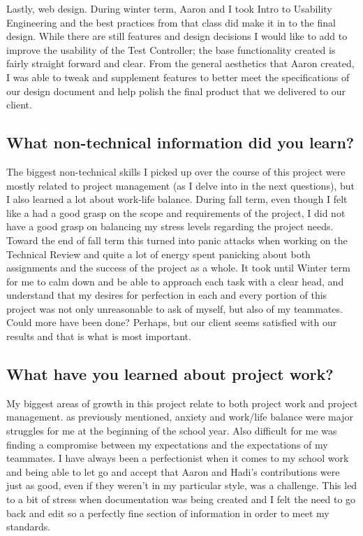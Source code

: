 \documentclass[onecolumn, draftclsnofoot,10pt, compsoc]{report}
\begin{document}
Lastly, web design. During winter term, Aaron and I took Intro to Usability Engineering and the best practices from that class did make it in to the final design. While there are still features and design decisions I would like to add to improve the usability of the Test Controller; the base functionality created is fairly straight forward and clear. From the general aesthetics that Aaron created, I was able to tweak and supplement features to better meet the specifications of our design document and help polish the final product that we delivered to our client. 

\subsection{What non-technical information did you learn?}
The biggest non-technical skills I picked up over the course of this project were mostly related to project management (as I delve into in the next questions), but I also learned a lot about work-life balance. During fall term, even though I felt like a had a good grasp on the scope and requirements of the project, I did not have a good grasp on balancing my stress levels regarding the project needs. Toward the end of fall term this turned into panic attacks when working on the Technical Review and quite a lot of energy spent panicking about both assignments and the success of the project as a whole. It took until Winter term for me to calm down and be able to approach each task with a clear head, and understand that my desires for perfection in each and every portion of this project was not only unreasonable to ask of myself, but also of my teammates. Could more have been done? Perhaps, but our client seems satisfied with our results and that is what is most important. 

\subsection{What have you learned about project work?}
My biggest areas of growth in this project relate to both project work and project management. as previously mentioned, anxiety and work/life balance were major struggles for me at the beginning of the school year. Also difficult for me was finding a compromise between my expectations and the expectations of my teammates. I have always been a perfectionist when it comes to my school work and being able to let go and accept that Aaron and Hadi's contributions were just as good, even if they weren't in my particular style, was a challenge. This led to a bit of stress when documentation was being created and I felt the need to go back and edit so a perfectly fine section of information in  order to meet my standards.
\end{document}
